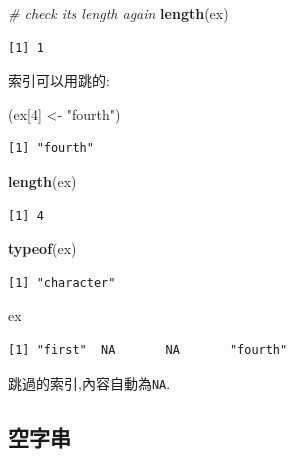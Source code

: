 \documentclass[]{book}
\newenvironment{Shaded}{\begin{snugshade}}{\end{snugshade}}
\newcommand{\CommentTok}[1]{\textcolor[rgb]{0.56,0.35,0.01}{\textit{#1}}}
\newcommand{\DecValTok}[1]{\textcolor[rgb]{0.00,0.00,0.81}{#1}}
\newcommand{\KeywordTok}[1]{\textcolor[rgb]{0.13,0.29,0.53}{\textbf{#1}}}
\newcommand{\NormalTok}[1]{#1}
\newcommand{\StringTok}[1]{\textcolor[rgb]{0.31,0.60,0.02}{#1}}
\theoremstyle{definition}
\theoremstyle{definition}
\theoremstyle{definition}
\theoremstyle{remark}
\begin{document}
\begin{Shaded}
\begin{Highlighting}[]
\CommentTok{# check its length again}
\KeywordTok{length}\NormalTok{(ex)}
\end{Highlighting}
\end{Shaded}

\begin{verbatim}
[1] 1
\end{verbatim}

索引可以用跳的:

\begin{Shaded}
\begin{Highlighting}[]
\NormalTok{(ex[}\DecValTok{4}\NormalTok{] <-}\StringTok{ "fourth"}\NormalTok{)}
\end{Highlighting}
\end{Shaded}

\begin{verbatim}
[1] "fourth"
\end{verbatim}

\begin{Shaded}
\begin{Highlighting}[]
\KeywordTok{length}\NormalTok{(ex)}
\end{Highlighting}
\end{Shaded}

\begin{verbatim}
[1] 4
\end{verbatim}

\begin{Shaded}
\begin{Highlighting}[]
\KeywordTok{typeof}\NormalTok{(ex)}
\end{Highlighting}
\end{Shaded}

\begin{verbatim}
[1] "character"
\end{verbatim}

\begin{Shaded}
\begin{Highlighting}[]
\NormalTok{ex}
\end{Highlighting}
\end{Shaded}

\begin{verbatim}
[1] "first"  NA       NA       "fourth"
\end{verbatim}

跳過的索引,內容自動為\texttt{NA}.

\subsection{空字串}
\end{document}
